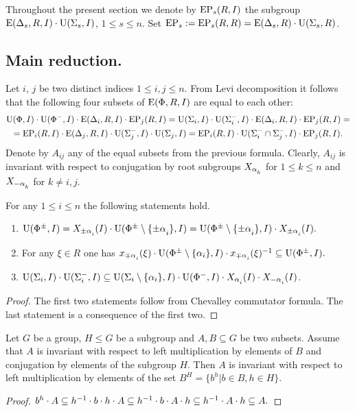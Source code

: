 Throughout the present section we denote by $\operatorname{EP}_s(R, I)$ the subgroup $\operatorname{E}(\Delta_s, R, I) \cdot \operatorname{U}(\Sigma_s, I)$, $1 \leq s \leq n$.
Set $\operatorname{EP}_s := \operatorname{EP}_s(R, R) = \operatorname{E}(\Delta_s, R) \cdot \operatorname{U}(\Sigma_s, R)$. 

\subsection{Main reduction.}
Let $i$, $j$ be two distinct indices $1\leq i,j \leq n$. From Levi decomposition it follows that the following four subsets of $\operatorname{E}(\Phi, R, I)$ are equal to each other:
\begin{multline}\nonumber \operatorname{U}(\Phi, I)\cdot \operatorname{U}(\Phi^-, I) \cdot \operatorname{E}(\Delta_i, R, I) \cdot \operatorname{EP}_j(R, I) = \operatorname{U}(\Sigma_i, I)\cdot \operatorname{U}(\Sigma^-_i, I) \cdot \operatorname{E}(\Delta_i, R, I) \cdot \operatorname{EP}_j(R, I) = \\
= \operatorname{EP}_i(R, I) \cdot \operatorname{E}(\Delta_j, R, I) \cdot \operatorname{U}(\Sigma_j^-, I)\cdot \operatorname{U}(\Sigma_j, I) = \operatorname{EP}_i(R, I) \cdot \operatorname{U}(\Sigma^-_i\cap \Sigma^-_j, I) \cdot \operatorname{EP}_j(R, I). \end{multline}
Denote by $A_{ij}$ any of the equal subsets from the previous formula. 
Clearly, $A_{ij}$ is invariant with respect to conjugation by root subgroups $X_{\alpha\ssub{k}}$ for $1\leq k\leq n$ and $X_{-\alpha\ssub{k}}$ for $k\neq i,j$.

\begin{lemma}\label{lemma:dv_unipotent} For any $1\leq i\leq n$ the following statements hold. \begin{enumerate} 
\item $\U(\Phi^\pm, I) = X_{\pm\alpha\ssub{i}}(I)\cdot \U(\Phi^\pm\setminus\{\pm\alpha\ssub{i}\}, I) = \U(\Phi^\pm\setminus\{\pm\alpha\ssub{i}\}, I)\cdot X_{\pm\alpha\ssub{i}}(I).$
\item For any $\xi\in R$ one has $x_{\mp\alpha\ssub{i}}(\xi)\cdot \U(\Phi^\pm\setminus\{\alpha_i\}, I)\cdot x_{\mp\alpha\ssub{i}}(\xi)^{-1} \subseteq \U(\Phi^\pm, I).$
\item $\U(\Sigma_i, I)\cdot \U(\Sigma^-_i, I) \subseteq \U(\Sigma_i\setminus \{\alpha_i\}, I) \cdot \U(\Phi^-, I) \cdot X_{\alpha\ssub{i}}(I) \cdot X_{-\alpha\ssub{i}}(I)$.
\end{enumerate} \end{lemma}
\begin{proof}
 The first two statements follow from Chevalley commutator formula. The last statement is a consequence of the first two.
\end{proof}

\begin{lemma}\label{lemma:conj_lemma} Let $G$ be a group, $H\leq G$ be a subgroup and $A, B\subseteq G$ be two subsets.
Assume that $A$ is invariant with respect to left multiplication by elements of $B$ and conjugation by elements of the subgroup $H$.
Then $A$ is invariant with respect to left multiplication by elements of the set $B^H = \{b^h \vert b\in B, h\in H\}$. \end{lemma}
\begin{proof} $b^h \cdot A \subseteq h^{-1}\cdot b \cdot h \cdot A \subseteq h^{-1} \cdot b \cdot A \cdot h \subseteq h^{-1} \cdot A \cdot h \subseteq A. \qedhere$ \end{proof}


